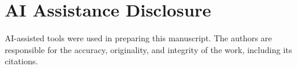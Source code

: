\documentclass[sigconf,anonymous]{aamas}
\begin{document}
\section*{AI Assistance Disclosure}

AI-assisted tools were used in preparing this manuscript. The authors are responsible for the accuracy, originality, and integrity of the work, including its citations.



\end{document}
